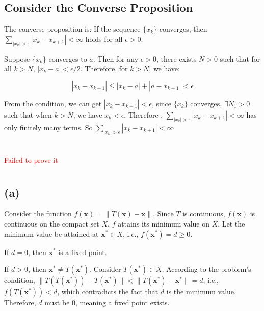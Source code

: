 \documentclass{article}
\begin{document}
\subsection*{Consider the Converse Proposition} 

The converse proposition is: If the sequence $ \{x_k\} $ converges, then $ \sum_{|x_k| > \epsilon} |x_k - x_{k + 1}| < \infty $ holds for all $ \epsilon > 0 $.

Suppose $ \{x_k\} $ converges to $ a $. Then for any $ \epsilon > 0 $, there exists $ N>0 $ such that for all $ k > N $, $ |x_k - a| < \epsilon/2 $. Therefore, for $ k > N $, we have:

$$
|x_k - x_{k + 1}| \leq |x_k - a| + |a - x_{k + 1}| < \epsilon
$$

From the condition, we can get $|x_k - x_{k + 1}| < \epsilon$,  since $ \{x_k\} $ converges, $\exists N_1>0 $ such that when $k>N$, we have $x_k<\epsilon$. Therefore , $ \sum_{|x_k| > \epsilon} |x_k - x_{k + 1}| < \infty $ has only finitely many terms. So $ \sum_{|x_k| > \epsilon} |x_k - x_{k + 1}| < \infty $

\section{}
\textcolor{red}{Failed to prove it}

\section{}

\subsection*{(a)} 

Consider the function $ f(\mathbf{x}) = \|T(\mathbf{x}) - \mathbf{x}\| $. Since $ T $ is continuous, $ f(\mathbf{x}) $ is continuous on the compact set $ X $. $ f $ attains its minimum value on $ X $. Let the minimum value be attained at $ \mathbf{x}^* \in X $, i.e., $ f(\mathbf{x}^*) = d \geq 0 $.  

If $ d = 0 $, then $ \mathbf{x}^* $ is a fixed point.  

If $ d > 0 $, then $ \mathbf{x}^* \neq T(\mathbf{x}^*) $. Consider $ T(\mathbf{x}^*) \in X $. According to the problem's condition, $ \|T(T(\mathbf{x}^*)) - T(\mathbf{x}^*)\| < \|T(\mathbf{x}^*) - \mathbf{x}^*\| = d $, i.e., $ f(T(\mathbf{x}^*)) < d $, which contradicts the fact that $ d $ is the minimum value. Therefore, $ d $ must be 0, meaning a fixed point exists.  
\end{document}
